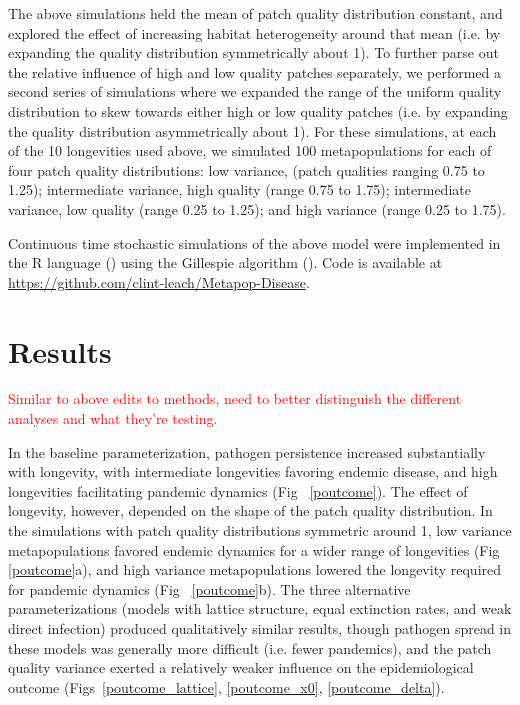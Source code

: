 \documentclass{svjour3}
\begin{document}
The above simulations held the mean of patch quality distribution constant, and explored the effect of increasing habitat heterogeneity around that mean (i.e. by expanding the quality distribution symmetrically about 1).  To further parse out the relative influence of high and low quality patches separately, we performed a second series of simulations where we expanded the range of the uniform quality distribution to skew towards either high or low quality patches (i.e. by expanding the quality distribution asymmetrically about 1).  For these simulations, at each of the 10 longevities used above, we simulated 100 metapopulations for each of four patch quality distributions: low variance, (patch qualities ranging 0.75 to 1.25); intermediate variance, high quality (range 0.75 to 1.75); intermediate variance, low quality (range 0.25 to 1.25); and high variance (range 0.25 to 1.75). 

Continuous time stochastic simulations of the above model were implemented in the R language (\cite{R2014}) using the Gillespie algorithm (\cite{Gillespie1977}).  Code is available at \url{https://github.com/clint-leach/Metapop-Disease}.

\section{Results}
\label{results}

\textcolor{red}{Similar to above edits to methods, need to better distinguish the different analyses and what they're testing.}

In the baseline parameterization, pathogen persistence increased substantially with longevity, with intermediate longevities favoring endemic disease, and high longevities facilitating pandemic dynamics (Fig~ \ref{poutcome}).  The effect of longevity, however, depended on the shape of the patch quality distribution.  In the simulations with patch quality distributions symmetric around 1, low variance metapopulations favored endemic dynamics for a wider range of longevities (Fig~ \ref{poutcome}a), and high variance metapopulations lowered the longevity required for pandemic dynamics (Fig~ \ref{poutcome}b).  The three alternative parameterizations (models with lattice structure, equal extinction rates, and weak direct infection) produced qualitatively similar results, though pathogen spread in these models was generally more difficult (i.e. fewer pandemics), and the patch quality variance exerted a relatively weaker influence on the epidemiological outcome (Figs~\ref{poutcome_lattice}, \ref{poutcome_x0}, \ref{poutcome_delta}).
\end{document}
